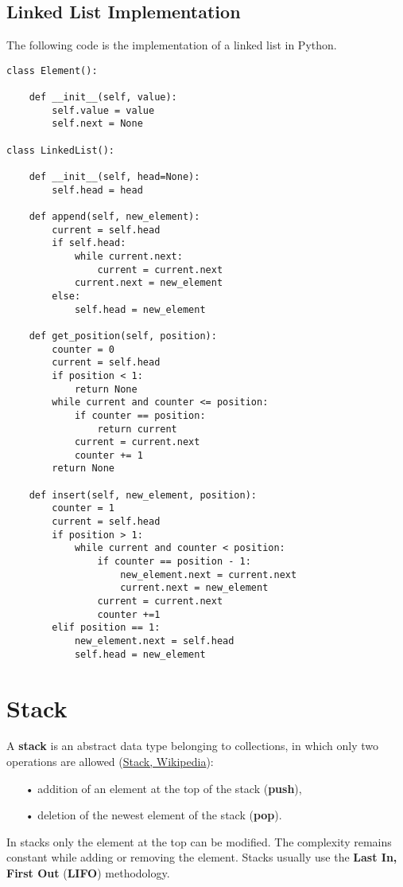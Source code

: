 \subsection{Linked List Implementation}
The following code is the implementation of a linked list in Python.
\begin{lstlisting}[firstnumber=1, caption={Linked List implementation.}]
class Element():

	def __init__(self, value):
		self.value = value
		self.next = None
		
class LinkedList():

	def __init__(self, head=None):
		self.head = head
		
	def append(self, new_element):
		current = self.head
		if self.head:
			while current.next:
				current = current.next
			current.next = new_element
		else:
			self.head = new_element
	
	def get_position(self, position):
		counter = 0
		current = self.head
		if position < 1:
			return None
		while current and counter <= position:
			if counter == position:
				return current
			current = current.next
			counter += 1
		return None
	
	def insert(self, new_element, position):
		counter = 1
		current = self.head
		if position > 1:
			while current and counter < position:
				if counter == position - 1:
					new_element.next = current.next
					current.next = new_element
				current = current.next
				counter +=1 
		elif position == 1:
			new_element.next = self.head
			self.head = new_element
\end{lstlisting}

\section{Stack}
\label{stack}
A \textbf{stack} is an abstract data type belonging to collections, in which only two operations are allowed \cite{wikistack} (\href{https://en.wikipedia.org/wiki/Stack_(abstract_data_type)}{Stack, Wikipedia}):
\begin{itemize}
\item[•] addition of an element at the top of the stack (\textbf{push}),
\item[•] deletion of the newest element of the stack (\textbf{pop}).
\end{itemize}
In stacks only the element at the top can be modified. The complexity remains constant while adding or removing the element. Stacks usually use the \textbf{Last In, First Out} (\textbf{LIFO}) methodology.

